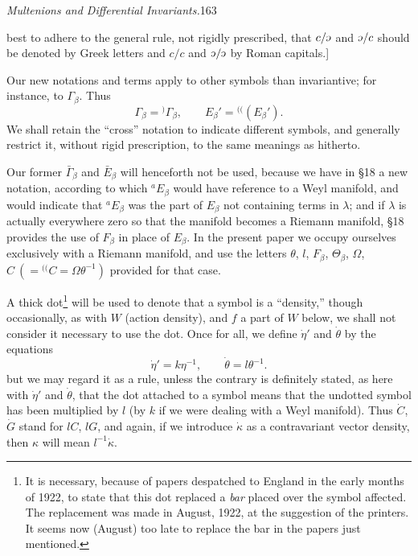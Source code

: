 \documentclass[11pt]{article}
\newcommand{\invc}{\mathord{\rotatebox[origin=c]{180}{$c$}}}
\newcommand{\invc}{\mathord{\text{\invcfont ɔ}}}
\newcommand{\markpair}[3]{{}^{#1#2}#3}
\begin{document}
\newpage\thispagestyle{empty}\begin{center}\textit{Multenions and Differential Invariants.}\hfill 163\end{center}
best to adhere to the general rule, not rigidly prescribed, that $c/\invc$ and $\invc/c$ should be denoted by Greek letters and $c/c$ and $\invc/\invc$ by Roman capitals.]

\indent Our new notations and terms apply to other symbols than invariantive; for instance, to $\Gamma_\beta$. Thus
\[
  \Gamma_\beta={}^{)}\Gamma_\beta,\qquad E_\beta'=\markpair{(}{(}{(E_\beta')}.
\]
We shall retain the ``cross'' notation to indicate different symbols, and generally restrict it, without rigid prescription, to the same meanings as hitherto.

\indent Our former $\bar\Gamma_\beta$ and $\bar E_\beta$ will henceforth not be used, because we have in §18 a new notation, according to which ${}^aE_\beta$ would have reference to a Weyl manifold, and would indicate that ${}^aE_\beta$ was the part of $E_\beta$ not containing terms in $\lambda$; and if $\lambda$ is actually everywhere zero so that the manifold becomes a Riemann manifold, §18 provides the use of $F_\beta$ in place of $E_\beta$. In the present paper we occupy ourselves exclusively with a Riemann manifold, and use the letters $\theta$, $l$, $F_\beta$, $\Theta_\beta$, $\Omega$, $C\ (=\markpair{(}{(}{C}=\Omega\theta^{-1})$ provided for that case.

\indent A thick dot\footnote{It is necessary, because of papers despatched to England in the early months of 1922, to state that this dot replaced a \emph{bar} placed over the symbol affected. The replacement was made in August, 1922, at the suggestion of the printers. It seems now (August) too late to replace the bar in the papers just mentioned.} will be used to denote that a symbol is a ``density,'' though occasionally, as with $W$ (action density), and $f$ a part of $W$ below, we shall not consider it necessary to use the dot. Once for all, we define $\dot\eta'$ and $\dot\theta$ by the equations
\begin{equation}
  \dot\eta'=k\eta^{-1},\qquad \dot\theta=l\theta^{-1}.
\tag{1}
\end{equation}
but we may regard it as a rule, unless the contrary is definitely stated, as here with $\dot\eta'$ and $\dot\theta$, that the dot attached to a symbol means that the undotted symbol has been multiplied by $l$ (by $k$ if we were dealing with a Weyl manifold). Thus $\dot C$, $\dot G$ stand for $lC$, $lG$, and again, if we introduce $\dot\kappa$ as a contravariant vector density, then $\kappa$ will mean $l^{-1}\dot\kappa$.
\end{document}

